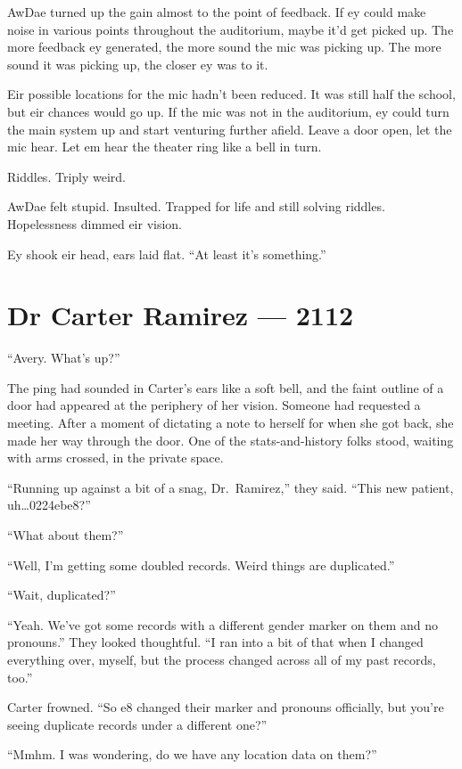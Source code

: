 AwDae turned up the gain almost to the point of feedback. If ey could make noise in various points throughout the auditorium, maybe it'd get picked up. The more feedback ey generated, the more sound the mic was picking up. The more sound it was picking up, the closer ey was to it.

Eir possible locations for the mic hadn't been reduced. It was still half the school, but eir chances would go up. If the mic was not in the auditorium, ey could turn the main system up and start venturing further afield. Leave a door open, let the mic hear. Let em hear the theater ring like a bell in turn.

Riddles. Triply weird.

AwDae felt stupid. Insulted. Trapped for life and still solving riddles. Hopelessness dimmed eir vision.

Ey shook eir head, ears laid flat. ``At least it's something.''

\chapter*{Dr Carter Ramirez — 2112}

``Avery. What's up?''

The ping had sounded in Carter's ears like a soft bell, and the faint outline of a door had appeared at the periphery of her vision. Someone had requested a meeting. After a moment of dictating a note to herself for when she got back, she made her way through the door. One of the stats-and-history folks stood, waiting with arms crossed, in the private space.

``Running up against a bit of a snag, Dr.~Ramirez,'' they said. ``This new patient, uh\ldots{}0224ebe8?''

``What about them?''

``Well, I'm getting some doubled records. Weird things are duplicated.''

``Wait, duplicated?''

``Yeah. We've got some records with a different gender marker on them and no pronouns.'' They looked thoughtful. ``I ran into a bit of that when I changed everything over, myself, but the process changed across all of my past records, too.''

Carter frowned. ``So e8 changed their marker and pronouns officially, but you're seeing duplicate records under a different one?''

``Mmhm. I was wondering, do we have any location data on them?''

